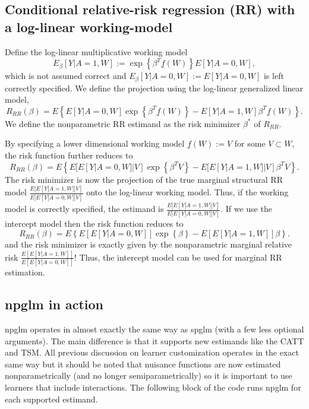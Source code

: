 \documentclass{article}
\begin{document}
\subsection{Conditional relative-risk regression (RR) with a log-linear working-model}
Define the log-linear multiplicative working model
$$E_{\beta}[Y|A=1,W] := \exp\left\{\beta^T \underline{f}(W) \right\}E[Y|A=0,W],$$
which is not assumed correct and $E_{\beta}[Y|A=0,W] := E[Y|A=0,W]$ is left correctly specified. We define the projection using the log-linear generalized linear model,
$$R_{RR}(\beta) = E \left\{E[Y|A=0,W] \exp\left\{ \beta^T \underline{f}(W)\right\}  -  E[Y|A=1,W]  \beta^T \underline{f}(W)\right\}.$$
We define the nonparametric RR estimand as the risk minimizer $\beta^*$ of $R_{RR}$. 

By specifying a lower dimensional working model $\underline{f}(W) := V$ for some $V \subset W$, the risk function further reduces to
$$R_{RR}(\beta) = E \left\{E[E[Y|A=0,W]|V] \exp\left\{ \beta^T V\right\}  -  E[E[Y|A=1,W]|V]  \beta^T V\right\}.$$
The risk minimizer is now the projection of the true marginal structural RR model $\frac{E[E[Y|A=1,W]|V]}{E[E[Y|A=0,W]|V]}$ onto the log-linear working model. Thus, if the working model is correctly specified, the estimand is $\frac{E[E[Y|A=1,W]|V]}{E[E[Y|A=0,W]|V]}$. If we use the intercept model then the risk function reduces to
$$R_{RR}(\beta) = E \left\{E[E[Y|A=0,W]] \exp\left\{ \beta \right\}  -  E[E[Y|A=1,W]]  \beta\right\}.$$
and the risk minimizer is exactly given by the nonparametric marginal relative risk $\frac{E[E[Y|A=1,W]]}{E[E[Y|A=0,W]]}$! Thus, the intercept model can be used for marginal RR estimation.


\subsection{npglm in action}
npglm operates in almost exactly the same way as spglm (with a few less optional arguments). The main difference is that it supports new estimands like the CATT and TSM. All previous discussion on learner customization operates in the exact same way but it should be noted that nuisance functions are now estimated nonparametrically (and no longer semiparametrically) so it is important to use learners that include interactions. The following block of the code runs npglm for each supported estimand.
\end{document}
